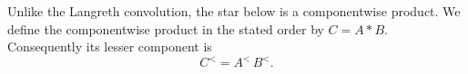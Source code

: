 \documentclass{article}
\begin{document}
Unlike the Langreth convolution, the star below is a componentwise product.
We define the componentwise product in the stated order by $C=A*B$.
Consequently its lesser component is
\begin{equation}
C^{<}=A^{<}\,B^{<}.\label{componentwise-lesser}
\end{equation}
\end{document}
